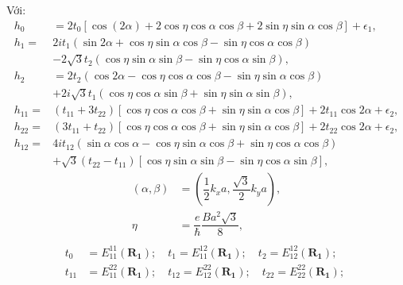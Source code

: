 \documentclass{article}
\begin{document}
Với:
\begin{align}
    h_0      & = 2 t_0 \left[ \cos (2\alpha) + 2\cos\eta \cos\alpha\cos\beta + 2\sin\eta\sin\alpha\cos\beta\right] +   \epsilon_1,             \\
    h_1=     & 2 i t_1 (\sin 2\alpha + \cos\eta\sin\alpha\cos\beta -    \sin\eta\cos\alpha\cos\beta )       \nonumber                          \\
             & - 2\sqrt{3}t_2\left( \cos\eta\sin\alpha\sin\beta - \sin\eta\cos\alpha\sin\beta  \right),                                        \\
    h_2      & = 2t_2 (\cos 2\alpha - \cos\eta\cos\alpha\cos\beta - \sin\eta\sin\alpha\cos\beta)                                               \\
             & + 2i\sqrt{3}t_1(\cos\eta\cos\alpha\sin\beta +  \sin\eta\sin\alpha\sin\beta),                                                   \\
    h_{11}=  & (t_{11} + 3t_{22}) \left[ \cos\eta\cos\alpha\cos\beta + \sin\eta\sin\alpha\cos\beta \right] + 2t_{11}\cos2\alpha + \epsilon_2 , \\
    h_{22}=  & (3t_{11} + t_{22}) \left[ \cos\eta\cos\alpha\cos\beta + \sin\eta\sin\alpha\cos\beta \right] + 2t_{22}\cos2\alpha + \epsilon_2,  \\
    h_{12} = & 4it_{12}(\sin\alpha\cos\alpha -\cos\eta\sin\alpha\cos\beta + \sin\eta\cos\alpha\cos\beta ) \nonumber                            \\
             & + \sqrt{3} (t_{22} - t_{11})\left[ \cos\eta\sin\alpha\sin\beta - \sin\eta\cos\alpha\sin\beta \right],
\end{align}
\begin{equation}
    \begin{split}
        (\alpha,\beta) & = \left(\dfrac{1}{2} k_x a,\dfrac{\sqrt{3}}{2} k_y a \right),\\
        \eta & = \dfrac{e}{\hbar}\dfrac{Ba^2\sqrt{3}}{8},\\
    \end{split}
\end{equation}
\begin{equation}
    \begin{split}
        t_0 & = E_{11}^{11}(\mathbf{R_1}); \quad t_1 = E_{11}^{12}(\mathbf{R_1}); \quad t_2 = E_{12}^{12}(\mathbf{R_1}); \quad \\
        t_{11} & = E_{11}^{22}(\mathbf{R_1}); \quad t_{12} = E_{12}^{22}(\mathbf{R_1}); \quad t_{22} = E_{22}^{22}(\mathbf{R_1});
    \end{split}
\end{equation}
\end{document}

